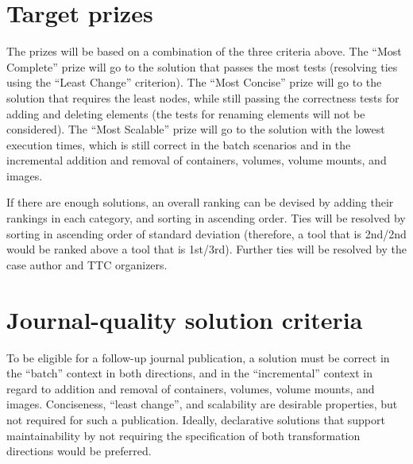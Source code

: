 \documentclass[twocolumn]{ceurart}
\begin{document}

\section{Target prizes}

The prizes will be based on a combination of the three criteria above. The
``Most Complete'' prize will go to the solution that passes the most tests
(resolving ties using the ``Least Change'' criterion). The ``Most Concise''
prize will go to the solution that requires the least nodes, while still passing
the correctness tests for adding and deleting elements (the tests for renaming
elements will not be considered). The ``Most Scalable'' prize will go to the
solution with the lowest execution times, which is still correct in the batch
scenarios and in the incremental addition and removal of containers, volumes,
volume mounts, and images.

If there are enough solutions, an overall ranking can be devised by adding their
rankings in each category, and sorting in ascending order. Ties will be resolved
by sorting in ascending order of standard deviation (therefore, a tool that is
2nd/2nd would be ranked above a tool that is 1st/3rd). Further ties will be
resolved by the case author and TTC organizers.

\section{Journal-quality solution criteria}

To be eligible for a follow-up journal publication, a solution must be correct
in the ``batch'' context in both directions, and in the ``incremental'' context
in regard to addition and removal of containers, volumes, volume mounts, and
images. Conciseness, ``least change'', and scalability are desirable properties,
but not required for such a publication. Ideally, declarative solutions that
support maintainability by not requiring the specification of both
transformation directions would be preferred.


\end{document}

